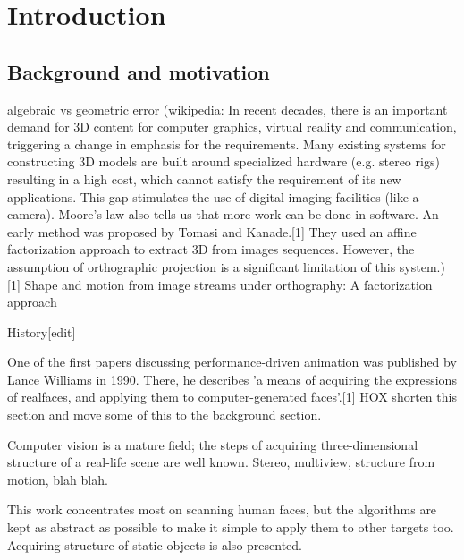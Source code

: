 \section{Introduction}

\thispagestyle{empty}

\subsection{Background and motivation}

algebraic vs geometric error
(wikipedia: In recent decades, there is an important demand for 3D content for computer graphics, virtual reality and communication, triggering a change in emphasis for the requirements. Many existing systems for constructing 3D models are built around specialized hardware (e.g. stereo rigs) resulting in a high cost, which cannot satisfy the requirement of its new applications. This gap stimulates the use of digital imaging facilities (like a camera). Moore's law also tells us that more work can be done in software. An early method was proposed by Tomasi and Kanade.[1] They used an affine factorization approach to extract 3D from images sequences. However, the assumption of orthographic projection is a significant limitation of this system.)
[1] Shape and motion from image streams under orthography: A factorization approach

History[edit]

One of the first papers discussing performance-driven animation was published by Lance Williams in 1990. There, he describes 'a means of acquiring the expressions of realfaces, and applying them to computer-generated faces'.[1]
HOX shorten this section and move some of this to the background section.

Computer vision is a mature field; the steps of acquiring three-dimensional structure of a real-life scene are well known.
Stereo, multiview, structure from motion, blah blah.

This work concentrates most on scanning human faces, but the algorithms are kept as abstract as possible to make it simple to apply them to other targets too.
Acquiring structure of static objects is also presented.

